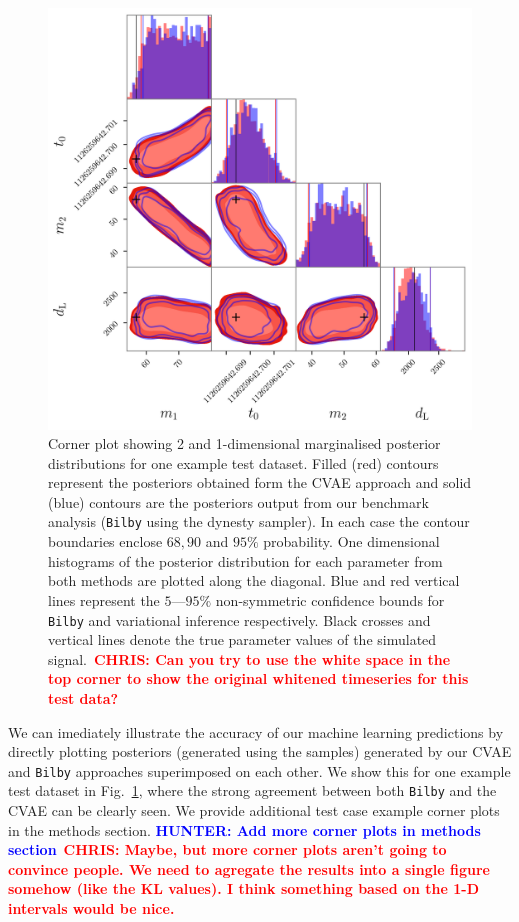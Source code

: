 \documentclass[%
showpacs,
 amsmath,amssymb,
 aps,
 twocolumn,
 prl,
 reprint,
floatfix,
]{revtex4-1}
\newcommand{\chris}[1]{\textbf{\textcolor{red}{CHRIS: #1}}}
\newcommand{\hunter}[1]{\textbf{\textcolor{blue}{HUNTER: #1}}}
\begin{document}
%
%
\begin{figure}
    \includegraphics[width=\textwidth]{images/corner_testcase0.png}
    \caption{\label{fig:corner_plot} Corner plot showing 2 and 1-dimensional
marginalised posterior distributions for one example test dataset. Filled (red)
contours represent the posteriors obtained form the \ac{CVAE} approach and
solid (blue) contours are the posteriors output from our benchmark analysis
(\texttt{Bilby} using the dynesty sampler). In each case the contour boundaries
enclose $68,90$ and $95\%$ probability. One dimensional histograms of the
posterior distribution for each parameter from both methods are plotted along
the diagonal. Blue and red vertical lines represent the $5$---$95\%$
non-symmetric confidence bounds for \texttt{Bilby} and variational inference
respectively. Black crosses and vertical lines denote the true parameter values
of the simulated signal.~\chris{Can you try to use the white space in the top
corner to show the original whitened timeseries for this test data?}} 
\end{figure}

%
%
We can imediately illustrate the accuracy of our machine learning predictions
by directly plotting posteriors (generated using the samples) generated by our
\ac{CVAE} and \texttt{Bilby} approaches superimposed on each other. We show
this for one example test dataset in Fig.~\ref{fig:corner_plot}, where the
strong agreement between both \texttt{Bilby} and the \ac{CVAE} can be clearly
seen. We provide additional test case example corner plots in the
methods section. \hunter{Add more corner plots in methods
section}~\chris{Maybe, but more corner plots aren't going to convince people.
We need to agregate the results into a single figure somehow (like the KL
values). I think something based on the 1-D intervals would be nice.}
\end{document}
